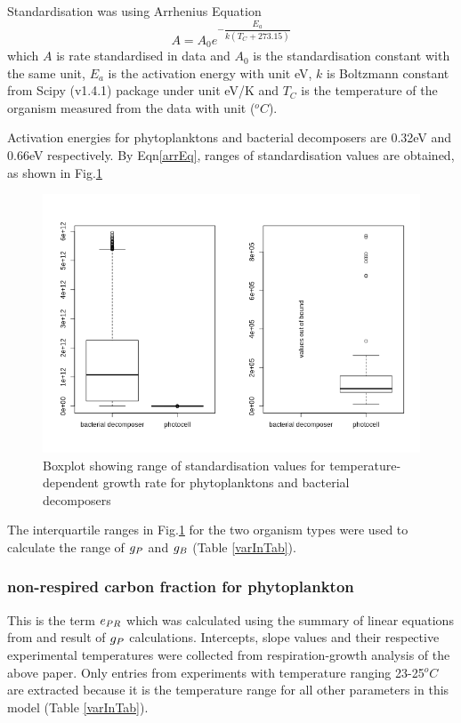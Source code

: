 \documentclass[../thesis.tex]{subfiles} %
\begin{document}
Standardisation was using Arrhenius Equation
\begin{equation}
    A = A_0e^{-\dfrac{E_a}{k(T_C+273.15)}}
    \label{arrEq}
\end{equation}
which $A$ is rate standardised in data and $A_0$ is the standardisation constant with the same unit, $E_a$ is the activation energy with unit eV, $k$ is Boltzmann constant from Scipy (v1.4.1) package under unit eV/K and $T_C$ is the temperature of the organism measured from the data with unit ($^oC$).

Activation energies for phytoplanktons and bacterial decomposers are 0.32eV and 0.66eV respectively.\autocite{regaudie2012temperature}  By Eqn\ref{arrEq}, ranges of standardisation values are obtained, as shown in Fig.\ref{growStdVal}

\begin{figure}[H]
    \centering
    \includegraphics[width=.8\linewidth]{media/stdCst.png}
    \caption[Boxplot of standardisation growth rates]{Boxplot showing range of standardisation values for temperature-dependent growth rate for phytoplanktons and bacterial decomposers}
    \label{growStdVal}
\end{figure}

The interquartile ranges in Fig.\ref{growStdVal} for the two organism types were used to calculate the range of $g_P$ and $g_B$ (Table \ref{varInTab}).

\subsubsection{non-respired carbon fraction for phytoplankton}
This is the term $e_{PR}$ which was calculated using the summary of linear equations from \autocite{j1989respiration} and result of $g_P$ calculations.  Intercepts, slope values and their respective experimental temperatures were collected from respiration-growth analysis of the above paper.  Only entries from experiments with temperature ranging 23-25$^oC$ are extracted because it is the temperature range for all other parameters in this model (Table \ref{varInTab}).
\end{document}
